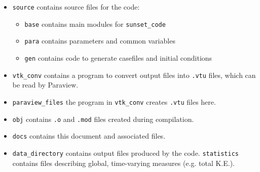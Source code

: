 \documentclass[notitlepage]{article}
\begin{document}
\begin{itemize}
\item \verb|source| contains source files for the code:
\begin{itemize}
\item \verb|base| contains main modules for \verb|sunset_code|
\item \verb|para| contains parameters and common variables
\item \verb|gen| contains code to generate casefiles and initial conditions
\end{itemize}
\item \verb|vtk_conv| contains a program to convert output files into \verb|.vtu| files, which can be read by Paraview.
\item \verb|paraview_files| the program in \verb|vtk_conv| creates \verb|.vtu| files here.
\item \verb|obj| contains \verb|.o| and \verb|.mod| files created during compilation.
\item \verb|docs| contains this document and associated files.
\item \verb|data_directory| contains output files produced by the code. \verb|statistics| contains files describing global, time-varying measures (e.g. total K.E.).
\end{itemize}  



\end{document}
